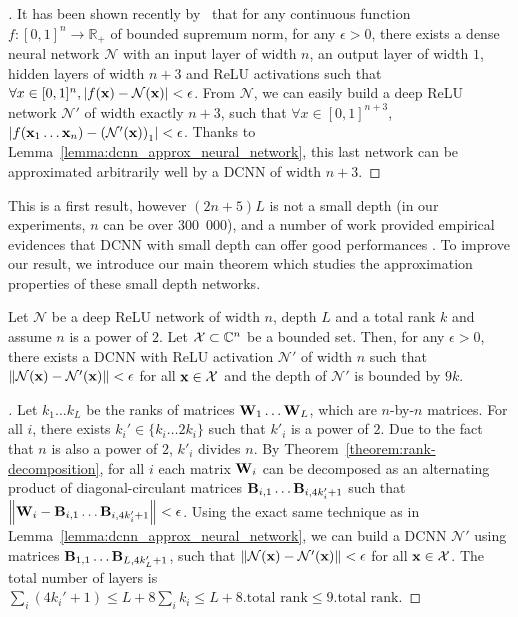 \begin{proof}[]
It has been shown recently by~\citet{hanin2017universal} that for any continuous function $f:[0,1]^{n} \rightarrow \mathbb{R}_+$ of bounded supremum norm, for any $\epsilon>0$, there exists a dense neural network $\mathcal{N}$ with an input layer of width $n$, an output layer of width $1$, hidden layers of width $n+3$ and ReLU activations such that $\forall x \in [0,1]^n, \left| f(\xvec) - \mathcal{N} \left(\xvec\right)\right| < \epsilon$. From $\mathcal{N}$, we can easily build a deep ReLU network $\mathcal{N'}$ of width exactly $n+3$, such that $\forall x \in [0,1]^{n+3}$, $\left|f(\xvec_{1} \ldots \xvec_{n}) - \left(\mathcal{N}'\left(\xvec\right)\right)_{1}\right| < \epsilon$. Thanks to Lemma~\ref{lemma:dcnn_approx_neural_network}, this last network can be approximated arbitrarily well by a DCNN of width $n+3$.
\end{proof}


This is a first result, however $(2n+5)L$ is not a small depth (in our experiments, $n$ can be over 300~000), and a number of work provided empirical evidences that DCNN with small depth can offer good performances \cite{anca2018eccv,cheng}. To improve our result, we introduce our main theorem which studies the approximation properties of these small depth networks.

\begin{theorem} \label{theorem:low_rank_nn}
Let $\mathcal{N}$ be a deep ReLU network of width $n$, depth $L$ and a total rank $k$ and assume $n$ is a power of $2$.
Let $\mathcal{X} \subset {\ensuremath \mathbb{C}}^{n}$ be a bounded set.
Then, for any $\epsilon > 0$, there exists a DCNN with ReLU activation $\mathcal{N}'$ of width $n$ such that $\norm{ \mathcal{N}(\mathbf{x}) - \mathcal{N}'(\mathbf{x})} < \epsilon$ for all $\mathbf{x} \in \mathcal{X}$ and the depth of $\mathcal{N}'$ is bounded by $9k$.
\end{theorem}

\begin{proof}[]
Let $k_{1} \ldots k_{L}$ be the ranks of matrices $\mathbf{W}_{1} \ldots \mathbf{W}_{L}$, which are $n$-by-$n$ matrices.
For all $i$, there exists $k_{i}' \in \{k_{i} \ldots 2k_{i}\}$ such that $k'_{i}$ is a power of $2$.
Due to the fact that $n$ is also a power of $2$, $k'_{i}$ divides $n$.
By Theorem~\ref{theorem:rank-decomposition}, for all $i$ each matrix $\mathbf{W}_{i}$ can be decomposed as an alternating product of diagonal-circulant matrices $\mathbf{B}_{i,1} \ldots \mathbf{B}_{i,4k'_{i}+1}$ such that $\norm{ \mathbf{W}_{i} - \mathbf{B}_{i,1} \ldots \mathbf{B}_{i,4k'_{i}+1}} < \epsilon$.
Using the exact same technique as in Lemma~\ref{lemma:dcnn_approx_neural_network}, we can build a DCNN $\mathcal{N}'$ using matrices $\mathbf{B}_{1,1} \ldots \mathbf{B}_{L,4k'_{L}+1}$, such that $\norm{ \mathcal{N}(\mathbf{x}) - \mathcal{N}'(\mathbf{x})} < \epsilon$ for all $\mathbf{x} \in \mathcal{X}$.
The total number of layers is $\sum_{i}\left(4k_{i}'+1\right)\le L+8\sum_{i}k_{i}\le L+8.
\textrm{total rank} \le 9.\textrm{total rank}$.
\end{proof}


